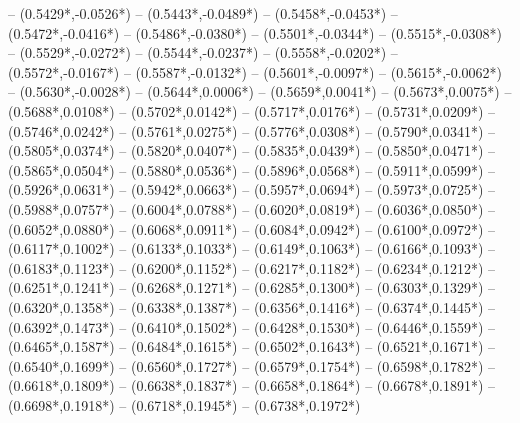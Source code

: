 {	-- ({0.5429*\dx},{-0.0526*\dy})
	-- ({0.5443*\dx},{-0.0489*\dy})
	-- ({0.5458*\dx},{-0.0453*\dy})
	-- ({0.5472*\dx},{-0.0416*\dy})
	-- ({0.5486*\dx},{-0.0380*\dy})
	-- ({0.5501*\dx},{-0.0344*\dy})
	-- ({0.5515*\dx},{-0.0308*\dy})
	-- ({0.5529*\dx},{-0.0272*\dy})
	-- ({0.5544*\dx},{-0.0237*\dy})
	-- ({0.5558*\dx},{-0.0202*\dy})
	-- ({0.5572*\dx},{-0.0167*\dy})
	-- ({0.5587*\dx},{-0.0132*\dy})
	-- ({0.5601*\dx},{-0.0097*\dy})
	-- ({0.5615*\dx},{-0.0062*\dy})
	-- ({0.5630*\dx},{-0.0028*\dy})
	-- ({0.5644*\dx},{0.0006*\dy})
	-- ({0.5659*\dx},{0.0041*\dy})
	-- ({0.5673*\dx},{0.0075*\dy})
	-- ({0.5688*\dx},{0.0108*\dy})
	-- ({0.5702*\dx},{0.0142*\dy})
	-- ({0.5717*\dx},{0.0176*\dy})
	-- ({0.5731*\dx},{0.0209*\dy})
	-- ({0.5746*\dx},{0.0242*\dy})
	-- ({0.5761*\dx},{0.0275*\dy})
	-- ({0.5776*\dx},{0.0308*\dy})
	-- ({0.5790*\dx},{0.0341*\dy})
	-- ({0.5805*\dx},{0.0374*\dy})
	-- ({0.5820*\dx},{0.0407*\dy})
	-- ({0.5835*\dx},{0.0439*\dy})
	-- ({0.5850*\dx},{0.0471*\dy})
	-- ({0.5865*\dx},{0.0504*\dy})
	-- ({0.5880*\dx},{0.0536*\dy})
	-- ({0.5896*\dx},{0.0568*\dy})
	-- ({0.5911*\dx},{0.0599*\dy})
	-- ({0.5926*\dx},{0.0631*\dy})
	-- ({0.5942*\dx},{0.0663*\dy})
	-- ({0.5957*\dx},{0.0694*\dy})
	-- ({0.5973*\dx},{0.0725*\dy})
	-- ({0.5988*\dx},{0.0757*\dy})
	-- ({0.6004*\dx},{0.0788*\dy})
	-- ({0.6020*\dx},{0.0819*\dy})
	-- ({0.6036*\dx},{0.0850*\dy})
	-- ({0.6052*\dx},{0.0880*\dy})
	-- ({0.6068*\dx},{0.0911*\dy})
	-- ({0.6084*\dx},{0.0942*\dy})
	-- ({0.6100*\dx},{0.0972*\dy})
	-- ({0.6117*\dx},{0.1002*\dy})
	-- ({0.6133*\dx},{0.1033*\dy})
	-- ({0.6149*\dx},{0.1063*\dy})
	-- ({0.6166*\dx},{0.1093*\dy})
	-- ({0.6183*\dx},{0.1123*\dy})
	-- ({0.6200*\dx},{0.1152*\dy})
	-- ({0.6217*\dx},{0.1182*\dy})
	-- ({0.6234*\dx},{0.1212*\dy})
	-- ({0.6251*\dx},{0.1241*\dy})
	-- ({0.6268*\dx},{0.1271*\dy})
	-- ({0.6285*\dx},{0.1300*\dy})
	-- ({0.6303*\dx},{0.1329*\dy})
	-- ({0.6320*\dx},{0.1358*\dy})
	-- ({0.6338*\dx},{0.1387*\dy})
	-- ({0.6356*\dx},{0.1416*\dy})
	-- ({0.6374*\dx},{0.1445*\dy})
	-- ({0.6392*\dx},{0.1473*\dy})
	-- ({0.6410*\dx},{0.1502*\dy})
	-- ({0.6428*\dx},{0.1530*\dy})
	-- ({0.6446*\dx},{0.1559*\dy})
	-- ({0.6465*\dx},{0.1587*\dy})
	-- ({0.6484*\dx},{0.1615*\dy})
	-- ({0.6502*\dx},{0.1643*\dy})
	-- ({0.6521*\dx},{0.1671*\dy})
	-- ({0.6540*\dx},{0.1699*\dy})
	-- ({0.6560*\dx},{0.1727*\dy})
	-- ({0.6579*\dx},{0.1754*\dy})
	-- ({0.6598*\dx},{0.1782*\dy})
	-- ({0.6618*\dx},{0.1809*\dy})
	-- ({0.6638*\dx},{0.1837*\dy})
	-- ({0.6658*\dx},{0.1864*\dy})
	-- ({0.6678*\dx},{0.1891*\dy})
	-- ({0.6698*\dx},{0.1918*\dy})
	-- ({0.6718*\dx},{0.1945*\dy})
	-- ({0.6738*\dx},{0.1972*\dy})
}

